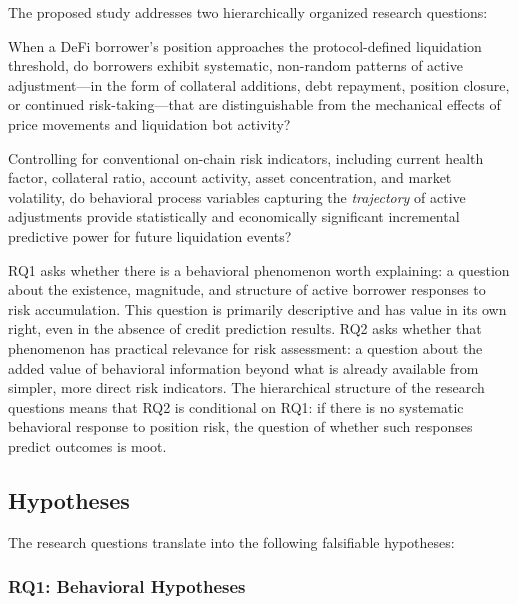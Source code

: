 The proposed study addresses two hierarchically organized research questions:

\begin{description}[leftmargin=*,labelindent=\parindent, itemindent=0pt]
\item[RQ1 (Behavioral Layer).] When a DeFi borrower's position approaches the protocol-defined liquidation threshold, do borrowers exhibit systematic, non-random patterns of active adjustment—in the form of collateral additions, debt repayment, position closure, or continued risk-taking—that are distinguishable from the mechanical effects of price movements and liquidation bot activity?

\item[RQ2 (Credit Layer).] Controlling for conventional on-chain risk indicators, including current health factor, collateral ratio, account activity, asset concentration, and market volatility, do behavioral process variables capturing the \emph{trajectory} of active adjustments provide statistically and economically significant incremental predictive power for future liquidation events?
\end{description}

RQ1 asks whether there is a behavioral phenomenon worth explaining: a question about the existence, magnitude, and structure of active borrower responses to risk accumulation. This question is primarily descriptive and has value in its own right, even in the absence of credit prediction results. RQ2 asks whether that phenomenon has practical relevance for risk assessment: a question about the added value of behavioral information beyond what is already available from simpler, more direct risk indicators. The hierarchical structure of the research questions means that RQ2 is conditional on RQ1: if there is no systematic behavioral response to position risk, the question of whether such responses predict outcomes is moot.

\subsection{Hypotheses}

The research questions translate into the following falsifiable hypotheses:

\subsubsection*{RQ1: Behavioral Hypotheses}


